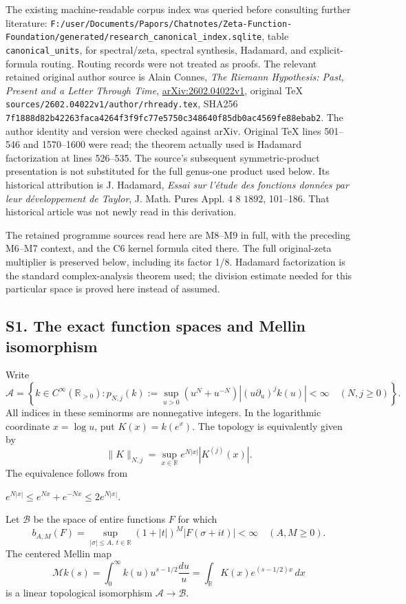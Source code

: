 \documentclass[
]{article}
\begin{document}
The existing machine-readable corpus index was queried before consulting
further literature:
\nolinkurl{F:/user/Documents/Papors/Chatnotes/Zeta-Function-Foundation/generated/research_canonical_index.sqlite},
table \texttt{canonical\_units}, for spectral/zeta, spectral synthesis,
Hadamard, and explicit-formula routing. Routing records were not treated
as proofs. The relevant retained original author source is Alain Connes,
\emph{The Riemann Hypothesis: Past, Present and a Letter Through Time},
\href{https://arxiv.org/abs/2602.04022v1}{arXiv:2602.04022v1}, original
TeX \nolinkurl{sources/2602.04022v1/author/rhready.tex}, SHA256
\nolinkurl{7f1888d82b42263faca4264f3f9fc77e5750c348640f85db0ac4569fe88ebab2}.
The author identity and version were checked against arXiv. Original TeX
lines 501--546 and 1570--1600 were read; the theorem actually used is
Hadamard factorization at lines 526--535. The source's subsequent
symmetric-product presentation is not substituted for the full genus-one
product used below. Its historical attribution is J. Hadamard,
\emph{Essai sur l'étude des fonctions données par leur développement de
Taylor}, J. Math. Pures Appl. \(4\) 8 \(1892\), 101--186. That
historical article was not newly read in this derivation.

The retained programme sources read here are M8--M9 in full, with the
preceding M6--M7 context, and the C6 kernel formula cited there. The
full original-zeta multiplier is preserved below, including its factor
1/8. Hadamard factorization is the standard complex-analysis theorem
used; the division estimate needed for this particular space is proved
here instead of assumed.

\subsection{S1. The exact function spaces and Mellin
isomorphism}\label{s1.-the-exact-function-spaces-and-mellin-isomorphism}

Write \[
\mathcal A=\left\{k\in C^\infty(\mathbb R_{>0}):
p_{N,j}(k):=\sup_{u>0}(u^N+u^{-N})
\left|(u\partial_u)^j k(u)\right|<\infty\quad(N,j\ge0)\right\}.
\tag{S1.1}
\] All indices in these seminorms are nonnegative integers. In the
logarithmic coordinate \(x=\log u\), put \(K(x)=k(e^x)\). The topology
is equivalently given by \[
\|K\|_{N,j}=\sup_{x\in\mathbb R}e^{N|x|}|K^{(j)}(x)|.
\tag{S1.2}
\] The equivalence follows from

\(e^{N|x|}\le e^{Nx}+e^{-Nx}\le2e^{N|x|}\).

Let \(\mathcal B\) be the space of entire functions \(F\) for which \[
b_{A,M}(F)=\sup_{|\sigma|\le A,\ t\in\mathbb R}
(1+|t|)^M|F(\sigma+it)|<\infty
\quad(A,M\ge0).
\tag{S1.3}
\] The centered Mellin map \[
\mathcal M k(s)=\int_0^\infty k(u)u^{s-1/2}\frac{du}{u}
=\int_{\mathbb R}K(x)e^{(s-1/2)x}\,dx
\tag{S1.4}
\] is a linear topological isomorphism \(\mathcal A\to\mathcal B\).
\end{document}
